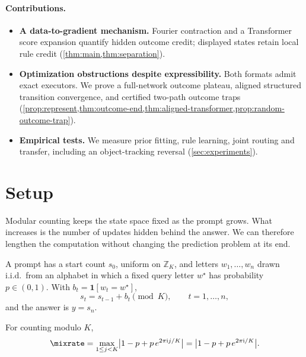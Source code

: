 \paragraph{Contributions.}
\begin{itemize}[leftmargin=*,itemsep=3pt,topsep=3pt]
\item \textbf{A data-to-gradient mechanism.} Fourier contraction and a Transformer
score expansion quantify hidden outcome credit; displayed states retain local rule
credit (\cref{thm:main,thm:separation}).
\item \textbf{Optimization obstructions despite expressibility.} Both formats admit
exact executors. We prove a full-network outcome plateau, aligned structured
transition convergence, and certified two-path outcome traps
(\cref{prop:represent,thm:outcome-end,thm:aligned-transformer,prop:random-outcome-trap}).
\item \textbf{Empirical tests.} We measure prior fitting, rule learning, joint routing
and transfer, including an object-tracking reversal (\cref{sec:experiments}).
\end{itemize}

\section{Setup}
\label{sec:setup}
\label{sec:setting}

Modular counting keeps the state space fixed as the prompt grows. What increases is the number of updates hidden behind the
answer. We can therefore lengthen the computation without changing the prediction problem at its end.

\begin{definition}
\label{def:task}
A prompt has a start count $s_0$, uniform on $\mathbb Z_K$, and letters $w_1,\ldots,w_n$ drawn i.i.d.\ from an alphabet
in which a fixed query letter $w^\star$ has probability $p\in(0,1)$. With $b_t=\mathbf 1[w_t=w^\star]$,
\begin{equation}
 s_t=s_{t-1}+b_t\pmod K,\qquad t=1,\ldots,n,
 \label{eq:tracking}
\end{equation}
and the answer is $y=s_n$.
\end{definition}

\begin{definition}
\label{def:lambda}
For counting modulo $K$,
\begin{equation}
 \mixrate=\max_{1\le j<K}\bigl|1-p+p\,e^{2\pi\mathrm ij/K}\bigr|=\bigl|1-p+p\,e^{2\pi\mathrm i/K}\bigr|.
 \label{eq:lambda}
\end{equation}
\end{definition}

